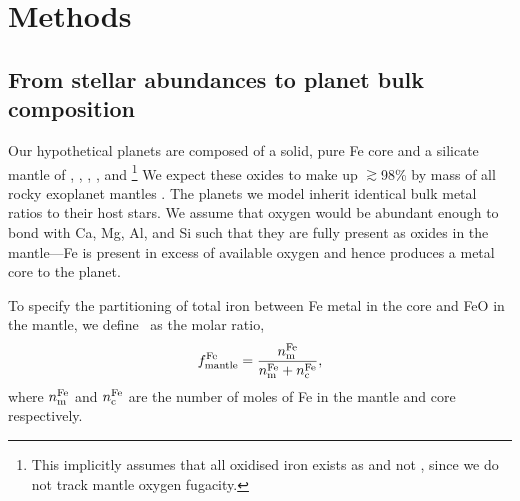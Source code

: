 \section{Methods}

\subsection{From stellar abundances to planet bulk composition}\label{sec:methods_comp}

Our hypothetical planets are composed of a solid, pure Fe core and a silicate mantle of , , , , and \footnote{This implicitly assumes that all oxidised iron exists as  and not , since we do not track mantle oxygen fugacity.} We expect these oxides to make up $\gtrsim$98\% by mass of all rocky exoplanet mantles \citep{putirka_composition_2019}. The planets we model inherit identical bulk metal ratios to their host stars. We assume that oxygen would be abundant enough to bond with Ca, Mg, Al, and Si such that they are fully present as oxides in the mantle---Fe is present in excess of available oxygen and hence produces a metal core to the planet. 

To specify the partitioning of total iron between Fe metal in the core and FeO in the mantle, we define \coreeff~as the molar ratio,
\begin{equation}\label{eq:core_eff}
    f^{\rm Fe}_{\rm mantle} = \frac{n_{\rm m}^{\rm Fe}}{n_{\rm m}^{\rm Fe} + n_{\rm c}^{\rm Fe}},
\end{equation}
where $n_{\rm m}^{\rm Fe}$ and $n_{\rm c}^{\rm Fe}$ are the number of moles of Fe in the mantle and core respectively.

